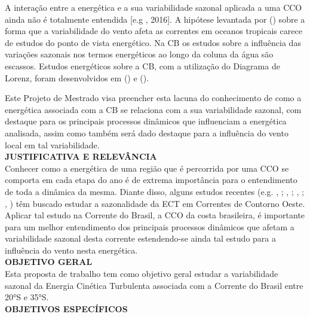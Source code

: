 \documentclass[portuguese,12pt,a4paper]{article}
\begin{document}
A interação entre a energética e a sua variabilidade sazonal aplicada a uma CCO ainda não é totalmente entendida [e.g , 2016]. A hipótese levantada por  (\citeyear{ferrari2009ocean}) sobre a forma que a variabilidade do vento afeta as correntes em oceanos tropicais carece de estudos do ponto de vista energético. Na CB os estudos sobre a influência das variações sazonais nos termos energéticos ao longo da coluna da água são escassos. Estudos energéticos sobre a CB, com a utilização do Diagrama de Lorenz, foram desenvolvidos em  (\citeyear{Brum-2017}) e  (\citeyear{magalhaes2017energetics}).

Este Projeto de Mestrado visa preencher esta lacuna do conhecimento de como a
energética associada com a CB se relaciona com a sua variabilidade sazonal, com
destaque para os principais processos dinâmicos que influenciam a energética
analisada, assim como também será dado destaque para a influência do vento local em
tal variabilidade.
 \\


\textbf{JUSTIFICATIVA E RELEVÂNCIA } \\

Conhecer como a energética de uma região que é percorrida por uma CCO se comporta em cada etapa do
ano é de extrema importância para o entendimento de toda a dinâmica da
mesma. Diante disso, alguns estudos recentes (e.g. , \citeyear{kang2016seasonal}; , \citeyear{zhang2021seasonal}; ,  \citeyear{liu2022}; , \citeyear{yan2023seasonal}) têm
buscado estudar a sazonalidade da ECT em Correntes de Contorno Oeste.
Aplicar tal estudo na Corrente do Brasil, a CCO da costa brasileira, é
importante para um melhor entendimento dos principais processos dinâmicos
que afetam a variabilidade sazonal desta corrente estendendo-se ainda tal estudo para a influência do vento nesta energética. \\

\textbf{OBJETIVO GERAL} \\ 

Esta proposta de trabalho tem como objetivo geral estudar a variabilidade sazonal da Energia Cinética Turbulenta associada com a Corrente do Brasil entre 20°S e 35°S. \\

\textbf{OBJETIVOS ESPECÍFICOS} 
\end{document}
